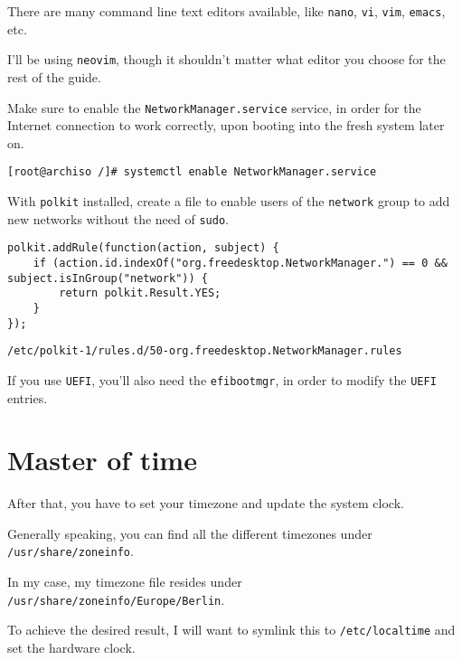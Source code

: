 \documentclass[10pt]{dustdoc}
\begin{document}
\begin{NOTE}
    There are many command line text editors available, like \texttt{nano}, \texttt{vi}, \texttt{vim}, \texttt{emacs}, etc.

    I’ll be using \texttt{neovim}, though it shouldn’t matter what editor you choose for the rest of the guide.
\end{NOTE}

Make sure to enable the \texttt{NetworkManager.service} service, in order for the Internet connection to work correctly, upon booting into the fresh system later on.

\begin{verbatim}
[root@archiso /]# systemctl enable NetworkManager.service
\end{verbatim}

With \texttt{polkit} installed, create a file to enable users of the \texttt{network} group to add new networks without the need of \texttt{sudo}.

\begin{mintedlisting}
    \begin{verbatim}
polkit.addRule(function(action, subject) {
    if (action.id.indexOf("org.freedesktop.NetworkManager.") == 0 && subject.isInGroup("network")) {
        return polkit.Result.YES;
    }
});
    \end{verbatim}

    \caption{\texttt{/etc/polkit-1/rules.d/50-org.freedesktop.NetworkManager.rules}}
\end{mintedlisting}

If you use \texttt{UEFI}, you’ll also need the \texttt{efibootmgr}, in order to modify the \texttt{UEFI} entries.

\section{Master of time}
\label{sec:master-of-time}

After that, you have to set your timezone and update the system clock.

Generally speaking, you can find all the different timezones under \texttt{/usr/share/zoneinfo}.

In my case, my timezone file resides under \texttt{/usr/share/zoneinfo/Europe/Berlin}.

To achieve the desired result, I will want to symlink this to \texttt{/etc/localtime} and set the hardware clock.
\end{document}
